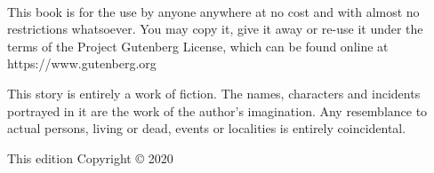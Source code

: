 {\small\RaggedRight
\setlength{\parindent}{0em}\setlength{\parskip}{1em}

~

\vfill

This book is for the use by anyone anywhere at no cost and with almost no restrictions whatsoever. You may copy it, give it away or re-use it under the terms of the Project Gutenberg License, which can be found online at https://www.gutenberg.org

This story is entirely a work of fiction. The names, characters and incidents portrayed in it are the work of the author’s imagination. Any resemblance to actual persons, living or dead, events or localities is entirely coincidental.

This edition Copyright \copyright{} 2020
}